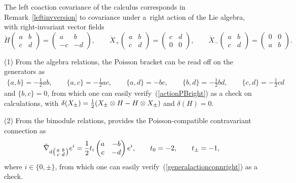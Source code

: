 \documentclass[pdftex]{sigma}
\numberwithin{equation}{section}
\newcommand{\<}{{\langle}}
\renewcommand{\>}{{\rangle}}
\newcommand{\tens}{\otimes}
\newcommand{\extd}{{\rm d}}
\newcommand{\tilder}{\grave}
\begin{document}
\begin{Example}
The left coaction covariance of the calculus corresponds in Remark~\ref{leftinvversion} to covariance under a~right action of the Lie algebra, with right-invariant vector fields
\[ \tilder H\begin{pmatrix} a & b \\ c & d \end{pmatrix}=\begin{pmatrix} a & b \\ -c & -d \end{pmatrix},\qquad \tilder X_+\begin{pmatrix} a & b \\ c & d \end{pmatrix}=\begin{pmatrix} c & d \\ 0 & 0 \end{pmatrix},\qquad \tilder X_-\begin{pmatrix} a & b \\ c & d \end{pmatrix}=\begin{pmatrix} 0 & 0 \\ a & b \end{pmatrix}. \]

(1) From the algebra relations, the Poisson bracket can be read off on the generators as
\begin{gather*} \lbrace a,b\rbrace=-\tfrac{1}{2} ab,\qquad\! \lbrace a,c\rbrace=-\tfrac{1}{2}ac,\qquad\! \lbrace a,d\rbrace=-bc, \qquad\! \lbrace b,d\rbrace=-\tfrac{1}{2}bd,\qquad\! \lbrace c,d\rbrace=-\tfrac{1}{2}cd\end{gather*}
and $\lbrace b,c\rbrace=0$, from which one can easily verify~(\ref{actionPBright}) as a check on calculations, with $\delta(X_\pm)={1\over2}(X_\pm\tens H-H\tens X_\pm)$ and $\delta(H)=0$.

(2) From the bimodule relations, \cite{MaTao:plg} provides the Poisson-compatible contravariant connection as
\[ \hat\nabla_{\extd \left(\begin{smallmatrix} a & b \\ c & d \end{smallmatrix}\right)}e^i={1\over 2}t_i \begin{pmatrix} a & -b \\ c & -d \end{pmatrix}e^i,\qquad t_0=-2,\qquad t_\pm=-1, \]
where $i\in\lbrace 0,\pm\rbrace$, from which one can easily verify~(\ref{generalactionconnright}) as a check.
\end{Example}
\end{document}
